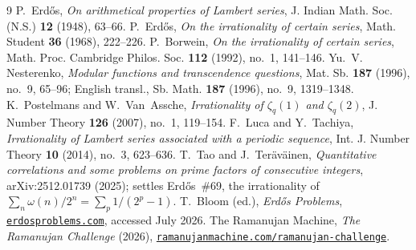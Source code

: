 \documentclass[11pt]{article}
\theoremstyle{definition}
\theoremstyle{remark}
\begin{document}
\begin{thebibliography}{9}
 P.~Erd\H{o}s, \emph{On arithmetical properties of Lambert series},
  J. Indian Math. Soc. (N.S.) \textbf{12} (1948), 63--66.
 P.~Erd\H{o}s, \emph{On the irrationality of certain series},
  Math. Student \textbf{36} (1968), 222--226.
 P.~Borwein, \emph{On the irrationality of certain series},
  Math. Proc. Cambridge Philos. Soc. \textbf{112} (1992), no.~1, 141--146.
 Yu.~V. Nesterenko, \emph{Modular functions and transcendence questions},
  Mat. Sb. \textbf{187} (1996), no.~9, 65--96; English transl., Sb. Math. \textbf{187} (1996), no.~9, 1319--1348.
 K.~Postelmans and W.~Van~Assche, \emph{Irrationality of $\zeta_q(1)$ and $\zeta_q(2)$},
  J. Number Theory \textbf{126} (2007), no.~1, 119--154.
 F.~Luca and Y.~Tachiya, \emph{Irrationality of Lambert series associated
  with a periodic sequence}, Int. J. Number Theory \textbf{10} (2014), no.~3, 623--636.
 T.~Tao and J.~Ter\"av\"ainen, \emph{Quantitative correlations and some
  problems on prime factors of consecutive integers}, arXiv:2512.01739 (2025);
  settles Erd\H{o}s~\#69, the irrationality of $\sum_{n}\omega(n)/2^n=\sum_{p}1/(2^p-1)$.
 T.~Bloom (ed.), \emph{Erd\H{o}s Problems},
  \href{https://www.erdosproblems.com}{\texttt{erdosproblems.com}}, accessed July 2026.
 The Ramanujan Machine, \emph{The Ramanujan Challenge} (2026),
  \href{https://www.ramanujanmachine.com/ramanujan-challenge/}{\texttt{ramanujanmachine.com/ramanujan-challenge}}.
\end{thebibliography}

\vfill
{}
\end{document}
